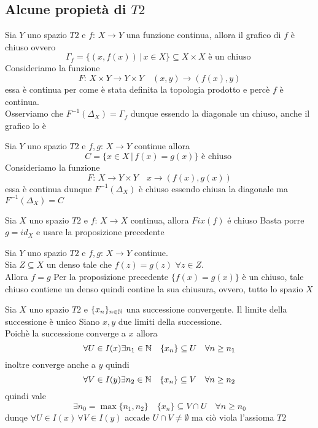 \subsection{Alcune propiet\`a di $T2$}
\begin{prop}
Sia $Y$ uno spazio $T2$ e $f:\, X \to Y$ una funzione continua, allora il grafico di $f$ \`e chiuso ovvero
$$ \Gamma_f=\{ (x,f(x)) \, \vert \, x \in X \} \subseteq X \times X \text{ \`e un chiuso }$$
\proof Consideriamo la funzione
$$ F:\, X \times Y  \to Y \times Y \quad (x,y) \to (f(x),y)$$
essa \`e continua per come \`e stata definita la topologia prodotto e perc\`e $f$ \`e continua.\\
Osserviamo che $F^{-1}(\Delta_X) = \Gamma_f$ dunque essendo la diagonale un chiuso, anche il grafico lo \`e
\endproof
\end{prop}
\begin{prop}
Sia $Y$ uno spazio $T2$ e $f,g:\, X \to Y$ continue allora
$$ C= \{ x \in X \, \vert \, f(x)=g(x) \} \text{ \`e chiuso } $$
\proof Consideriamo la funzione 
$$ F:\, X \to Y \times Y \quad x \to (f(x),g(x)) $$
essa \`e continua dunque $F^{-1}(\Delta_X)$ \`e chiuso essendo chiusa la diagonale ma $F^{-1}(\Delta_X)=C$
\endproof
\end{prop}
\begin{cor}
Sia $X$ uno spazio $T2$ e $f:\, X \to X $ continua, allora $Fix(f)$ \'e chiuso
\proof Basta porre $g=id_X$ e usare la proposizione precedente
\end{cor}
\begin{prop}
 Sia $Y$ uno spazio $T2$ e $f,g:\, X \to Y $ continue.\\
 Sia $Z\subseteq X$ un denso tale che $f(z)=g(z)$ $ \forall z \in Z $.\\
 Allora $f=g$
\proof Per la proposizione precedente $\{ f(x)=g(x)\}$ \`e un chiuso, tale chiuso contiene un denso quindi contine la sua chiusura, ovvero, tutto lo spazio $X$
\end{prop}

\spazio
\begin{prop}
Sia $X$ uno spazio $T2$ e $\displaystyle \{ x_n \}_{n \in \mathbb{N}} $ una successione convergente. Il limite della successione \`e unico
\proof Siano $x,y$ due limiti della successione.\\
Poich\`e la successione converge a $x$ allora
$$ \forall U \in I(x) \exists n_1 \in \mathbb{N} \quad \{x_n\} \subseteq U \quad \forall n\geq n_1$$
inoltre converge anche a $y$ quindi 
$$ \forall V \in I(y) \exists n_2 \in \mathbb{N} \quad \{x_n\} \subseteq V \quad \forall n\geq n_2$$
quindi vale 
$$ \exists n_0=\max \{ n_1,n_2\} \quad \{x_n\} \subseteq V\cap U \quad \forall n\geq n_0$$
dunqe $\forall U\in I(x)\, \forall V \in I(y)$ accade $U\cap V \neq \emptyset$ ma ci\`o viola l'assioma $T2$
\endproof
\end{prop}
\newpage

